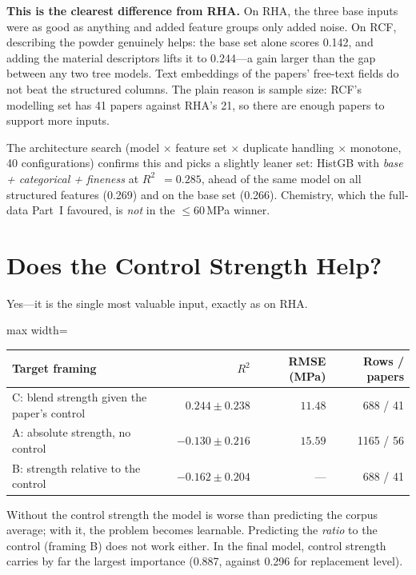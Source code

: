 \documentclass[11pt]{article}
\newcommand{\R}{$R^2$}
\begin{document}
\noindent \textbf{This is the clearest difference from RHA.} On RHA, the three base
inputs were as good as anything and added feature groups only added noise. On RCF,
describing the powder genuinely helps: the base set alone scores 0.142, and adding the
material descriptors lifts it to 0.244---a gain larger than the gap between any two tree
models. Text embeddings of the papers' free-text fields do not beat the structured
columns. The plain reason is sample size: RCF's modelling set has 41 papers against
RHA's 21, so there are enough papers to support more inputs.

The architecture search (model $\times$ feature set $\times$ duplicate handling $\times$
monotone, 40 configurations) confirms this and picks a slightly leaner set: HistGB with
\emph{base + categorical + fineness} at \R{}~$=0.285$, ahead of the same model on all
structured features (0.269) and on the base set (0.266). Chemistry, which the full-data
Part~I favoured, is \emph{not} in the $\leq60$\,MPa winner.

\section{Does the Control Strength Help?}
\label{sec:rcf-p3-control}
Yes---it is the single most valuable input, exactly as on RHA.

\begin{center}\small
\begin{adjustbox}{max width=\linewidth}
\begin{tabular}{lrrr}
\toprule
Target framing & \R{} & RMSE (MPa) & Rows / papers \\
\midrule
\rowcolor{green!12}C: blend strength given the paper's control & $\mathbf{0.244\pm0.238}$ & $11.48$ & 688 / 41 \\
A: absolute strength, no control & $-0.130\pm0.216$ & $15.59$ & 1165 / 56 \\
B: strength relative to the control & $-0.162\pm0.204$ & --- & 688 / 41 \\
\bottomrule
\end{tabular}
\end{adjustbox}
\end{center}

\noindent Without the control strength the model is worse than predicting the corpus
average; with it, the problem becomes learnable. Predicting the \emph{ratio} to the
control (framing B) does not work either. In the final model, control strength carries by
far the largest importance (0.887, against 0.296 for replacement level).
\end{document}
